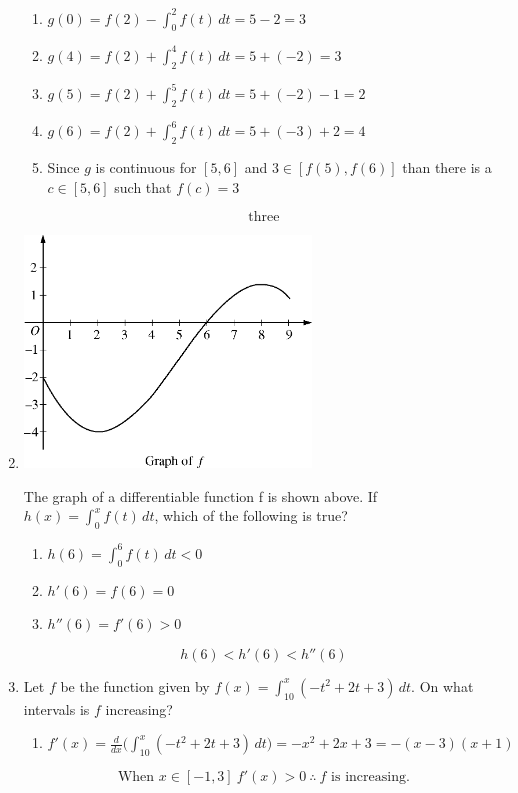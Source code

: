 \documentclass[12pt]{article}
\begin{document}
\begin{enumerate}
\begin{enumerate}
    \item $g(0)=f(2)-\int_{0}^{2} f(t) \, dt = 5-2=3$
    \item $g(4)=f(2)+\int_{2}^{4} f(t) \, dt = 5+(-2)=3$
    \item $g(5)=f(2)+\int_{2}^{5} f(t) \, dt = 5+(-2)-1=2$
    \item $g(6)=f(2)+\int_{2}^{6} f(t) \, dt = 5+(-3)+2=4$
    \item Since $g$ is continuous for $[5,6]$ and $3\in[f(5),f(6)]$ than there is a $c\in[5,6]$ such that $f(c)=3$
\end{enumerate}
$$\boxed{\text{three}}$$
\item
\begin{center}
    \includegraphics[width=3in]{original-20.png}
\end{center}
The graph of a differentiable function f is shown above. If $h(x)=\int_{0}^{x} f(t) \, dt$, which of the following is true?
\begin{enumerate}
    \item $h(6)= \int_{0}^{6} f(t) \, dt < 0$
    \item $h'(6)= f(6) = 0$
    \item $h''(6)=f'(6)>0$
\end{enumerate}
$$\boxed{h(6)< h'(6)< h''(6)}$$

\item Let $f$ be the function given by $f(x)=\int_{10}^{x} (-t^2+2t+3) \, dt$. On what intervals is $f$ increasing?
\begin{enumerate}
    \item $f'(x)= \frac{d}{dx}\big(\int_{10}^{x} (-t^2+2t+3) \, dt \big)=-x^2+2x+3 =-(x-3)(x+1)$
\end{enumerate}
$$\boxed{\text{When } x\in[-1,3] \: f'(x)>0 \: \therefore \: f \text{ is increasing.}}$$


\end{enumerate}
\end{document}
